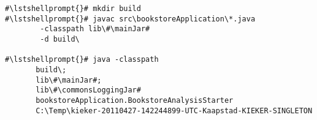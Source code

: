 \begin{lstlisting}[caption=Commands to compile and run the analysis under Windows,label=lst:bookstoreAnalysisStarterWin]
#\lstshellprompt{}# mkdir build
#\lstshellprompt{}# javac src\bookstoreApplication\*.java
        -classpath lib\#\mainJar#
        -d build\

#\lstshellprompt{}# java -classpath 
       build\;
       lib\#\mainJar#;
       lib\#\commonsLoggingJar#
       bookstoreApplication.BookstoreAnalysisStarter 
       C:\Temp\kieker-20110427-142244899-UTC-Kaapstad-KIEKER-SINGLETON
\end{lstlisting}	

